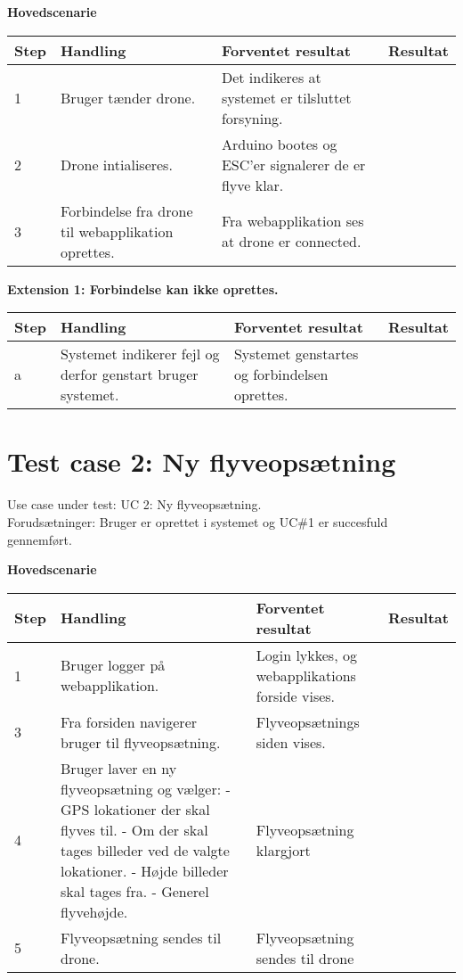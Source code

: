 \textbf{Hovedscenarie}
\begin{table}[H]
	\centering
		\begin{tabular}{|l|p{5 cm}|p{5 cm}|p{3.5 cm}|} 
		\hline
			Step & Handling & Forventet resultat & Resultat\\ \hline
			1 & Bruger tænder drone. & Det indikeres at systemet er tilsluttet forsyning. &   \\ \hline
			2 & Drone intialiseres. & Arduino bootes og ESC'er signalerer de er flyve klar. &   \\ \hline
			3 & Forbindelse fra drone til webapplikation oprettes. & Fra webapplikation ses at drone er connected. &  \\ \hline
		\end{tabular}
\end{table}

\textbf{Extension 1: Forbindelse kan ikke oprettes.}
\begin{table}[H]
	\centering
		\begin{tabular}{|l|p{5 cm}|p{5 cm}|p{3.5 cm}|} 
		\hline
			Step & Handling & Forventet resultat & Resultat\\ \hline
			a & Systemet indikerer fejl og derfor genstart bruger systemet. & Systemet genstartes og forbindelsen oprettes. & \\ \hline
		\end{tabular}
\end{table}

\newpage
\section{Test case 2: Ny flyveopsætning}
Use case under test: UC 2: Ny flyveopsætning.\\
Forudsætninger:	Bruger er oprettet i systemet og UC\#1 er succesfuld gennemført.

\textbf{Hovedscenarie}
\begin{table}[H]
	\centering
		\begin{tabular}{|l|p{5 cm}|p{5 cm}|p{3.5 cm}|} 
		\hline
			Step & Handling & Forventet resultat & Resultat\\ \hline
			1 & Bruger logger på webapplikation. & Login lykkes, og webapplikations forside vises. &  \\ \hline
			3 & Fra forsiden navigerer bruger til flyveopsætning. & Flyveopsætnings siden vises. & \\ \hline
			4 & Bruger laver en ny flyveopsætning og vælger: \newline
				- GPS lokationer der skal flyves til. \newline
				- Om der skal tages billeder ved de valgte lokationer. \newline
				- Højde billeder skal tages fra. \newline
				- Generel flyvehøjde.				
				 & Flyveopsætning klargjort & \\ \hline
			5 & Flyveopsætning sendes til drone. & Flyveopsætning sendes til drone & \\ \hline
		\end{tabular}
\end{table}


